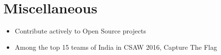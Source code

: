 \section*{\sc Miscellaneous}
\vspace{-2mm}
\hrulefill
\vspace{2mm}

\begin{itemize}
  \item Contribute actively to Open Source projects
  \item Among the top 15 teams of India in CSAW 2016, Capture The Flag
\end{itemize}
